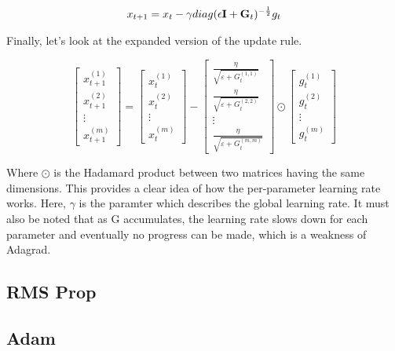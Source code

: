 \begin{align}
    x_{t+1} = x_{t} - \gamma diag(\epsilon\mathbf{I} + \mathbf{G}_t)^{-\frac{1}{2}} g_t
\end{align}


Finally, let's look  at the expanded version of the update rule. 

\[
\begin{bmatrix}
x^{(1)}_{t+1} \\
x^{(2)}_{t+1} \\
\vdots \\
x^{(m)}_{t+1}
\end{bmatrix}
=
\begin{bmatrix}
x^{(1)}_{t} \\
x^{(2)}_{t} \\
\vdots \\
x^{(m)}_{t}
\end{bmatrix}
-
\begin{bmatrix}
\frac{\eta}{\sqrt{\varepsilon + G^{(1,1)}_t}}\\
 \frac{\eta}{\sqrt{\varepsilon + G^{(2,2)}_t}}  \\
 \vdots\\
 \frac{\eta}{\sqrt{\varepsilon + G^{(m,m)}_t}}
\end{bmatrix}
\odot 
\begin{bmatrix}
g^{(1)}_t \\
g^{(2)}_t \\
\vdots \\
g^{(m)}_t
\end{bmatrix}
\]

Where $\odot$ is the Hadamard product between two matrices having the same dimensions. This provides a clear idea of how the per-parameter learning rate works. Here, $\gamma$ is the paramter which describes the global learning rate. It must also be noted that as G accumulates, the learning rate slows down for each parameter and eventually no progress can be made, which is a weakness of Adagrad. 

\subsection{RMS Prop}
\subsection{Adam}
